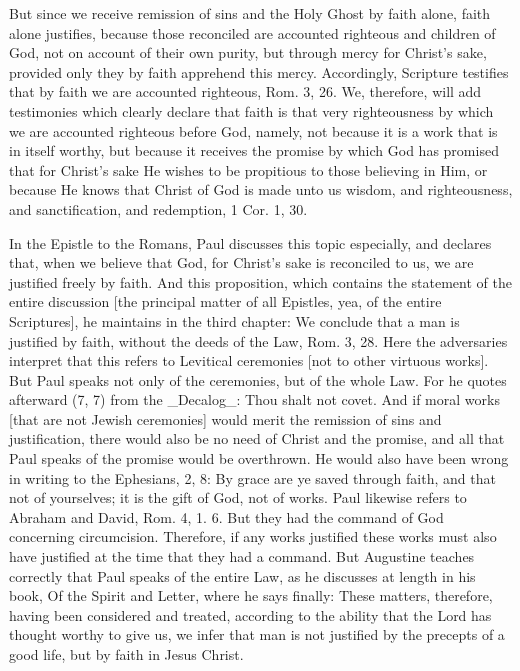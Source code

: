 But since we receive remission of sins and the Holy Ghost by faith
alone, faith alone justifies, because those reconciled are accounted
righteous and children of God, not on account of their own purity,
but through mercy for Christ's sake, provided only they by faith
apprehend this mercy.  Accordingly, Scripture testifies that by faith
we are accounted righteous, Rom. 3, 26. We, therefore, will add
testimonies which clearly declare that faith is that very
righteousness by which we are accounted righteous before God, namely,
not because it is a work that is in itself worthy, but because it
receives the promise by which God has promised that for Christ's sake
He wishes to be propitious to those believing in Him, or because He
knows that Christ of God is made unto us wisdom, and righteousness,
and sanctification, and redemption, 1 Cor. 1, 30.

In the Epistle to the Romans, Paul discusses this topic especially,
and declares that, when we believe that God, for Christ's sake is
reconciled to us, we are justified freely by faith.  And this
proposition, which contains the statement of the entire discussion
[the principal matter of all Epistles, yea, of the entire Scriptures],
he maintains in the third chapter: We conclude that a man is
justified by faith, without the deeds of the Law, Rom. 3, 28. Here
the adversaries interpret that this refers to Levitical ceremonies
[not to other virtuous works].  But Paul speaks not only of the
ceremonies, but of the whole Law.  For he quotes afterward (7, 7)
from the _Decalog_: Thou shalt not covet.  And if moral works [that
are not Jewish ceremonies] would merit the remission of sins and
justification, there would also be no need of Christ and the promise,
and all that Paul speaks of the promise would be overthrown.  He
would also have been wrong in writing to the Ephesians, 2, 8: By
grace are ye saved through faith, and that not of yourselves; it is
the gift of God, not of works.  Paul likewise refers to Abraham and
David, Rom. 4, 1. 6. But they had the command of God concerning
circumcision.  Therefore, if any works justified these works must
also have justified at the time that they had a command.  But
Augustine teaches correctly that Paul speaks of the entire Law, as he
discusses at length in his book, Of the Spirit and Letter, where he
says finally: These matters, therefore, having been considered and
treated, according to the ability that the Lord has thought worthy to
give us, we infer that man is not justified by the precepts of a good
life, but by faith in Jesus Christ.


